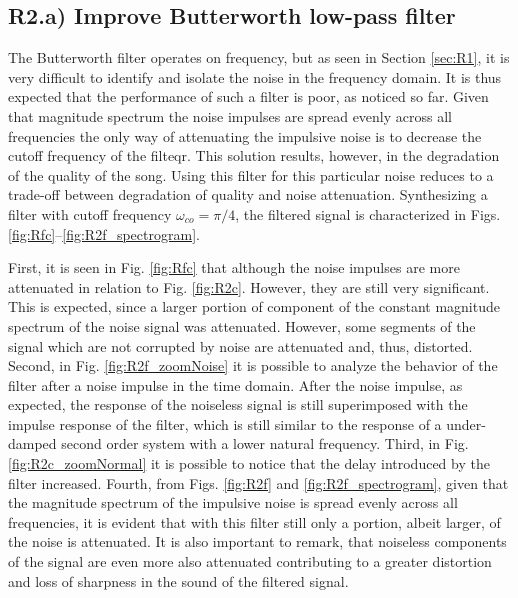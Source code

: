 \documentclass[]{scrartcl}
\begin{document}
\subsection{R2.a) Improve Butterworth low-pass filter}
The Butterworth filter operates on frequency, but as seen in Section \ref{sec:R1}, it is very difficult to identify and isolate the noise in the frequency domain. It is thus expected that the performance of such a filter is poor, as noticed so far. Given that magnitude spectrum the noise impulses are spread evenly across all frequencies the only way of attenuating the impulsive noise is to decrease the cutoff frequency of the filteqr. This solution results, however, in the degradation of the quality of the song. Using this filter for this particular noise reduces to a trade-off between degradation of quality and noise attenuation. Synthesizing a filter with cutoff frequency $\omega_{co} = \pi/4$, the filtered signal is characterized in Figs. \ref{fig:Rfc}--\ref{fig:R2f_spectrogram}. 

First, it is seen in Fig. \ref{fig:Rfc} that although the noise impulses are more attenuated in relation to Fig. \ref{fig:R2c}. However, they are still very significant. This is expected, since a larger portion of component of the constant magnitude spectrum of the noise signal was attenuated. However, some segments of the signal which are not corrupted by noise are attenuated and, thus, distorted. Second, in Fig. \ref{fig:R2f_zoomNoise} it is possible to analyze the behavior of the filter after a noise impulse in the time domain. After the noise impulse, as expected, the response of the noiseless signal is still superimposed with the impulse response of the filter, which is still similar to the response of a under-damped second order system with a lower natural frequency. Third, in Fig. \ref{fig:R2c_zoomNormal} it is possible to notice that the delay introduced by the filter increased. Fourth, from Figs. \ref{fig:R2f} and \ref{fig:R2f_spectrogram}, given that the magnitude spectrum of the impulsive noise is spread evenly across all frequencies, it is evident that with this filter still only a portion, albeit larger, of the noise is attenuated. It is also important to remark, that noiseless components of the signal are even more also attenuated contributing to a greater distortion and loss of sharpness in the sound of the filtered signal.
 
\end{document}
